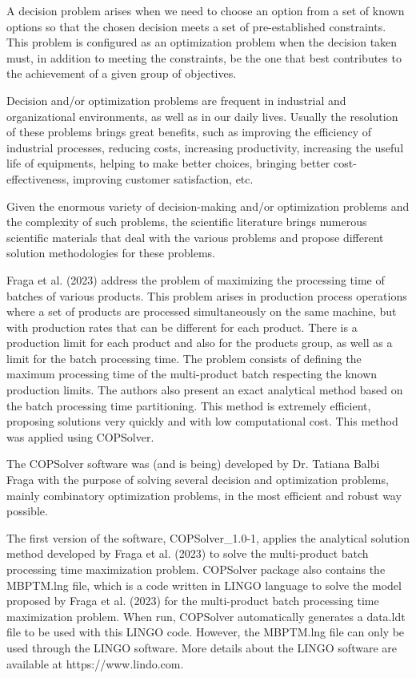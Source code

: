 \documentclass[11pt, letterpaper]{article}
\begin{document}
A decision problem arises when we need to choose an option from a set of known options so that the chosen decision meets a set of pre-established constraints. This problem is configured as an optimization problem when the decision taken must, in addition to meeting the constraints, be the one that best contributes to the achievement of a given group of objectives.

Decision and/or optimization problems are frequent in industrial and organizational environments, as well as in our daily lives. Usually the resolution of these problems brings great benefits, such as improving the efficiency of industrial processes, reducing costs, increasing productivity, increasing the useful life of equipments, helping to make better choices, bringing better cost-effectiveness, improving customer satisfaction, etc.

Given the enormous variety of decision-making and/or optimization problems and the complexity of such problems, the scientific literature brings numerous scientific materials that deal with the various problems and propose different solution methodologies for these problems.

Fraga et al. (2023) address the problem of maximizing the processing time of batches of various products. This problem arises in production process operations where a set of products are processed simultaneously on the same machine, but with production rates that can be different for each product. There is a production limit for each product and also for the products group, as well as a limit for the batch processing time. The problem consists of defining the maximum processing time of the multi-product batch respecting the known production limits. The authors also present an exact analytical method based on the batch processing time partitioning. This method is extremely efficient, proposing solutions very quickly and with low computational cost. This method was applied using COPSolver.

The COPSolver software was (and is being) developed by Dr. Tatiana Balbi Fraga with the purpose of solving several decision and optimization problems, mainly combinatory optimization problems, in the most efficient and robust way possible.

The first version of the software, COPSolver\_1.0-1, applies the analytical solution method developed by Fraga et al. (2023) to solve the multi-product batch processing time maximization problem. COPSolver package also contains the MBPTM.lng file, which is a code written in LINGO language to solve the model proposed by Fraga et al. (2023) for the multi-product batch processing time maximization problem. When run, COPSolver automatically generates a data.ldt file to be used with this LINGO code. However, the MBPTM.lng file can only be used through the LINGO software. More details about the LINGO software are available at https://www.lindo.com.
\end{document}
